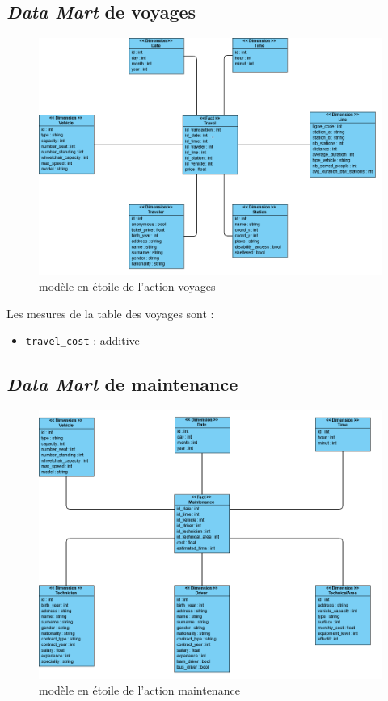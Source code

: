 \documentclass[a4paper,12pt]{report}
\begin{document}
\subsection*{\textit{Data Mart} de \og voyages \fg}
\label{subsec:data_mart_voyages}
\begin{figure}[!ht]
  \centering
  \includegraphics[scale=0.65]{images/voyages_datamart.png}
  \caption{modèle en étoile de l'action \og voyages \fg}
\end{figure}

Les mesures de la table des voyages sont :
\begin{itemize}
  \item \texttt{travel\_cost} : additive
\end{itemize}

\newpage

\subsection*{\textit{Data Mart} de \og maintenance \fg}
\label{subsec:data_mart_maintenance}
\begin{figure}[!ht]
  \centering
  \includegraphics[scale=0.65]{images/maintenance_datamart.png}
  \caption{modèle en étoile de l'action \og maintenance \fg}
\end{figure}
\end{document}
